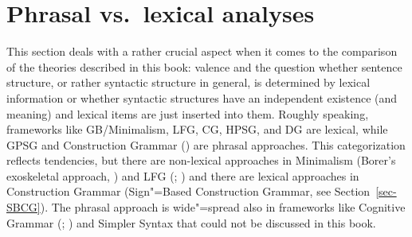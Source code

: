 \chapter{Phrasal vs.\ lexical analyses}
\label{Abschnitt-Phrasal-Lexikalisch}\label{chap-phrasal}



This section deals with a rather crucial aspect when it comes to the comparison of the theories
described in this book: valence and the question whether sentence structure, or rather syntactic
structure in general, is determined by lexical information or whether syntactic structures have an
independent existence (and meaning) and lexical items are just inserted into them. Roughly speaking,
frameworks like GB/Minimalism, LFG, CG, HPSG, and DG are lexical, while GPSG and Construction
Grammar (\citealp{Goldberg95a,Goldberg2003b,Tomasello2003a,Tomasello2006c,Croft2001a}) are
phrasal approaches. This categorization reflects tendencies, but there are non-lexical 
approaches in Minimalism (Borer's exoskeletal approach, \citeyear{Borer2003a-u}) and LFG
(\citealp{Alsina96a}; \citealp{ADT2008a,ADT2013a}) and there are lexical approaches in Construction
Grammar (Sign"=Based Construction Grammar, see Section~\ref{sec-SBCG}). The phrasal approach is
wide"=spread also in frameworks like Cognitive Grammar (\citealp{Dabrowska2001a}; \citealp[]{Langacker2009a})
 and Simpler Syntax \citep{CJ2005a,Jackendoff2008a} that could not be discussed in this book.

